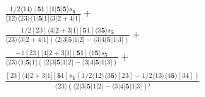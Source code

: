 \documentclass[varwidth, border=5pt]{standalone}
\begin{document}
\begin{my}
$\begin{gathered}
\scriptscriptstyle\frac{1/2⟨14⟩[𝟓1][1|𝟓|𝟓⟩s_{𝟓}}{⟨12⟩⟨23⟩⟨1|𝟓|1]⟨3|2+4|1]} +\\
\scriptscriptstyle\frac{1/2[23]⟨4|2+3|1][𝟓1]⟨3𝟓⟩s_{𝟓}}{⟨23⟩⟨3|2+4|1](⟨2|3|𝟓|1|2]-⟨3|4|𝟓|1|3])} +\\
\scriptscriptstyle\frac{-1[23]⟨4|2+3|1][𝟓1]⟨1𝟓⟩s_{𝟓}}{⟨23⟩⟨1|𝟓|1](⟨2|3|𝟓|1|2]-⟨3|4|𝟓|1|3])} +\\
\scriptscriptstyle\frac{[23]⟨4|2+3|1][𝟓1]s_{𝟓}(1/2⟨12⟩⟨3𝟓⟩[23]-1/2⟨13⟩⟨4𝟓⟩[34])}{⟨23⟩(⟨2|3|𝟓|1|2]-⟨3|4|𝟓|1|3])²} \phantom{+}
\end{gathered}$
\end{my}
\end{document}
